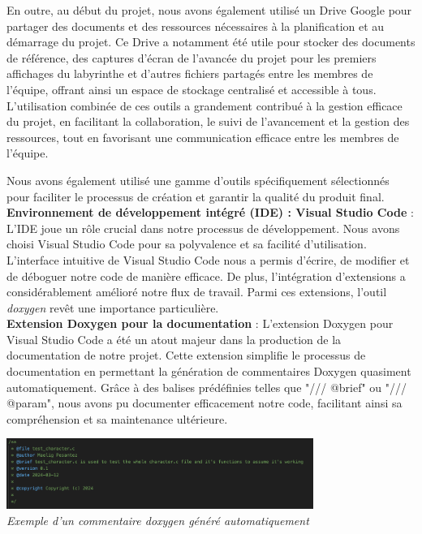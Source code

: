 \documentclass[10pt]{article}
\begin{document}
En outre, au début du projet, nous avons également utilisé un Drive Google pour partager des documents et des ressources nécessaires à la planification et au démarrage du projet. Ce Drive a notamment été utile pour stocker des documents de référence, des captures d'écran de l'avancée du projet pour les premiers affichages du labyrinthe et d'autres fichiers partagés entre les membres de l'équipe, offrant ainsi un espace de stockage centralisé et accessible à tous.\\

L'utilisation combinée de ces outils a grandement contribué à la gestion efficace du projet, en facilitant la collaboration, le suivi de l'avancement et la gestion des ressources, tout en favorisant une communication efficace entre les membres de l'équipe.

Nous avons également utilisé une gamme d'outils spécifiquement sélectionnés pour faciliter le processus de création et garantir la qualité du produit final. \\

\textbf{Environnement de développement intégré (IDE) : Visual Studio Code} :
L'IDE joue un rôle crucial dans notre processus de développement. Nous avons choisi Visual Studio Code pour sa polyvalence et sa facilité d'utilisation. L'interface intuitive de Visual Studio Code nous a permis d'écrire, de modifier et de déboguer notre code de manière efficace. De plus, l'intégration d'extensions a considérablement amélioré notre flux de travail. Parmi ces extensions, l'outil \textit{\gls{doxygen}} revêt une importance particulière.\\

\textbf{Extension Doxygen pour la documentation} :
L'extension Doxygen pour Visual Studio Code a été un atout majeur dans la production de la documentation de notre projet. Cette extension simplifie le processus de documentation en permettant la génération de commentaires Doxygen quasiment automatiquement. Grâce à des balises prédéfinies telles que "/// @brief" ou "/// @param", nous avons pu documenter efficacement notre code, facilitant ainsi sa compréhension et sa maintenance ultérieure.
\begin{center}
\includegraphics[width=10cm]{doxygen.png}\\
\caption{{\emph{Exemple d'un commentaire doxygen généré automatiquement}}}
\label{fig3}\\
\end{center}
\end{document}
